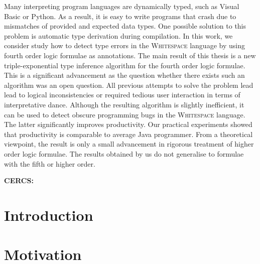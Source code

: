\documentclass{style/master-thesis}
\begin{document}
\noindent\textbf{\large \articleName}
\vspace*{3ex}
{ }
Many interpreting program languages are dynamically typed, such as Visual Basic or Python. As a result, it is easy to write programs that crash due to mismatches of provided and expected data types.  One possible solution to this problem is automatic type derivation during compilation. In this work, we consider study how to detect type errors in the \textsc{Whitespace} language by using fourth order logic formulae as annotations. The main result of this thesis is a new triple-exponential type inference algorithm for the fourth order logic formulae. This is a significant advancement as the question whether there exists such an algorithm was an open question. 
All previous attempts to solve the problem lead lead to logical inconsistencies or required tedious user interaction in terms of interpretative dance. Although the resulting algorithm is slightly inefficient, it can be used to detect obscure programming bugs in the \textsc{Whitespace} language. The latter significantly improves productivity. Our practical experiments showed that productivity is comparable to average Java programmer.   
From a theoretical viewpoint, the result is only a small advancement in rigorous treatment of higher order logic formulae. The results obtained by us do not generalise to formulae with the fifth or higher order. 


\vspace*{3ex}
{}
\vspace*{3ex}

\noindent\textbf{CERCS:}





\newpage
\tableofcontents



\section{Introduction}


\pagebreak

\section{Motivation}

\end{document}
